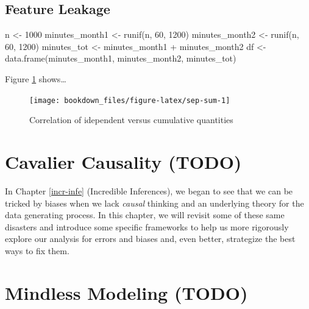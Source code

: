 \documentclass[
]{krantz}
\makeatletter
\newenvironment{Shaded}{\begin{snugshade}}{\end{snugshade}}
\newcommand{\DecValTok}[1]{\textcolor[rgb]{0.06,0.06,0.06}{#1}}
\newcommand{\FunctionTok}[1]{\textcolor[rgb]{0,0,0}{#1}}
\newcommand{\NormalTok}[1]{#1}
\newcommand{\OtherTok}[1]{\textcolor[rgb]{0.37,0.37,0.37}{#1}}
\newcommand{\SpecialCharTok}[1]{\textcolor[rgb]{0,0,0}{#1}}
\newenvironment{kframe}{%
\medskip{}
\setlength{\fboxsep}{.8em}
 \def\at@end@of@kframe{}%
 \ifinner\ifhmode%
  \def\at@end@of@kframe{\end{minipage}}%
  \begin{minipage}{\columnwidth}%
 \fi\fi%
 \def\FrameCommand##1{\hskip\@totalleftmargin \hskip-\fboxsep
 \colorbox{shadecolor}{##1}\hskip-\fboxsep
     \hskip-\linewidth \hskip-\@totalleftmargin \hskip\columnwidth}%
 \MakeFramed {\advance\hsize-\width
   \@totalleftmargin\z@ \linewidth\hsize
   \@setminipage}}%
 {\par\unskip\endMakeFramed%
 \at@end@of@kframe}
\renewenvironment{Shaded}{\begin{kframe}}{\end{kframe}}
\makeatother
\begin{document}
\hypertarget{feature-leakage}{%
\section{Feature Leakage}\label{feature-leakage}}

\begin{Shaded}
\begin{Highlighting}[]
\NormalTok{n }\OtherTok{\textless{}{-}} \DecValTok{1000}
\NormalTok{minutes\_month1 }\OtherTok{\textless{}{-}} \FunctionTok{runif}\NormalTok{(n, }\DecValTok{60}\NormalTok{, }\DecValTok{1200}\NormalTok{)}
\NormalTok{minutes\_month2 }\OtherTok{\textless{}{-}} \FunctionTok{runif}\NormalTok{(n, }\DecValTok{60}\NormalTok{, }\DecValTok{1200}\NormalTok{) }
\NormalTok{minutes\_tot }\OtherTok{\textless{}{-}}\NormalTok{ minutes\_month1 }\SpecialCharTok{+}\NormalTok{ minutes\_month2}
\NormalTok{df }\OtherTok{\textless{}{-}} \FunctionTok{data.frame}\NormalTok{(minutes\_month1, minutes\_month2, minutes\_tot)}
\end{Highlighting}
\end{Shaded}

Figure \ref{fig:sep-sum} shows\ldots{}

\begin{figure}

{\centering \texttt{[image: bookdown\_files/figure-latex/sep-sum-1]} 

}

\caption{Correlation of idependent versus cumulative quantities}\label{fig:sep-sum}
\end{figure}

\hypertarget{cava-caus}{%
\chapter{Cavalier Causality (TODO)}\label{cava-caus}}

In Chapter \ref{incr-infe} (Incredible Inferences), we began to see that we can be tricked by biases when we lack \emph{causal} thinking and an underlying theory for the data generating process. In this chapter, we will revisit some of these same disasters and introduce some specific frameworks to help us more rigorously explore our analysis for errors and biases and, even better, strategize the best ways to fix them.

\hypertarget{mind-mod}{%
\chapter{Mindless Modeling (TODO)}\label{mind-mod}}
\end{document}
